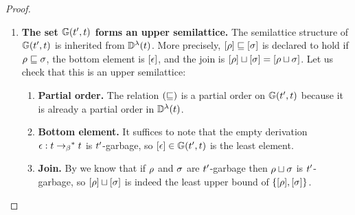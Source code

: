 \begin{proof}
\begin{enumerate}
\item
  {\bf The set $\mathbb{G}(t', t)$ forms an upper semilattice.}
  The semilattice structure of $\mathbb{G}(t', t)$ is inherited from $\mathbb{D}^{\lambda}(t)$.
  More precisely, ${[\rho]} \sqsubseteq {[\sigma]}$ is declared to hold if $\rho \sqsubseteq \sigma$,
  the bottom element is ${[\epsilon]}$, and the join is
  ${[\rho]} \sqcup {[\sigma]} = {[\rho \sqcup \sigma]}$.
  Let us check that this is an upper semilattice:
  \begin{enumerate}
  \item {\bf Partial order.}
    The relation $(\sqsubseteq)$ is a partial order on $\mathbb{G}(t', t)$ because it is already a partial order in $\mathbb{D}^{\lambda}(t)$.
  \item {\bf Bottom element.}
    It suffices to note that the empty derivation $\epsilon : t \mathrel{\to_\beta}^* t$
    is $t'$-garbage, so ${[\epsilon]} \in \mathbb{G}(t', t)$
    is the least element.
  \item {\bf Join.}
    By  we know that if $\rho$ and $\sigma$
    are $t'$-garbage then $\rho \sqcup \sigma$ is $t'$-garbage,
    so ${[\rho]} \sqcup {[\sigma]}$ is indeed the least upper bound
    of $\{{[\rho]}, {[\sigma]}\}$.
  \end{enumerate}
\end{enumerate}
\end{proof}

